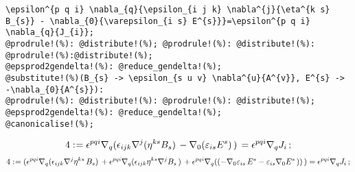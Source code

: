 \documentclass[11pt]{article}
\def\specialcolon{\mathrel{\mathop{:}}\hspace{-.5em}}
\begin{document}
{\color[named]{Blue}\begin{verbatim}
\epsilon^{p q i} \nabla_{q}{\epsilon_{i j k} \nabla^{j}{\eta^{k s} B_{s}} - \nabla_{0}{\varepsilon_{i s} E^{s}}}=\epsilon^{p q i} \nabla_{q}{J_{i}};
@prodrule!(%): @distribute!(%); @prodrule!(%): @distribute!(%): @prodrule!(%):@distribute!(%);
@epsprod2gendelta!(%): @reduce_gendelta!(%);
@substitute!(%)(B_{s} -> \epsilon_{s u v} \nabla^{u}{A^{v}}, E^{s} -> -\nabla_{0}{A^{s}}):
@prodrule!(%): @distribute!(%): @prodrule!(%): @distribute!(%);
@epsprod2gendelta!(%): @reduce_gendelta!(%);
@canonicalise!(%);
\end{verbatim}}
\begin{dmath*}[compact, spread=2pt]
4\specialcolon{}= {\epsilon}^{p q i} {\nabla}_{q}{({\epsilon}_{i j k} {\nabla}^{j}{({\eta}^{k s} {B}_{s})}\,  - {\nabla}_{0}{({\varepsilon}_{i s} {E}^{s})}\, )}\,  = {\epsilon}^{p q i} {\nabla}_{q}{{J}_{i}}\, ;
\end{dmath*}
\begin{dmath*}[compact, spread=2pt]
4\specialcolon{}= ({\epsilon}^{p q i} {\nabla}_{q}{({\epsilon}_{i j k} {\nabla}^{j}{{\eta}^{k s}}\,  {B}_{s})}\,  + {\epsilon}^{p q i} {\nabla}_{q}{({\epsilon}_{i j k} {\eta}^{k s} {\nabla}^{j}{{B}_{s}}\, )}\,  + {\epsilon}^{p q i} {\nabla}_{q}{(( - {\nabla}_{0}{{\varepsilon}_{i s}}\,  {E}^{s} - {\varepsilon}_{i s} {\nabla}_{0}{{E}^{s}}\, ))}\, ) = {\epsilon}^{p q i} {\nabla}_{q}{{J}_{i}}\, ;
\end{dmath*}
\end{document}
